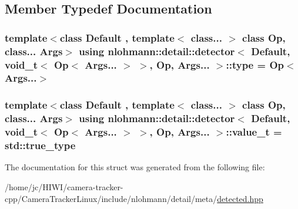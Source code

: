 \subsection{Member Typedef Documentation}
\subsubsection[{\texorpdfstring{type}{type}}]{\setlength{\rightskip}{0pt plus 5cm}template$<$class Default , template$<$ class... $>$ class Op, class... Args$>$ using {\bf nlohmann\+::detail\+::detector}$<$ Default, {\bf void\+\_\+t}$<$ Op$<$ Args... $>$ $>$, Op, Args... $>$\+::{\bf type} =  Op$<$Args...$>$}\hypertarget{structnlohmann_1_1detail_1_1detector_3_01_default_00_01void__t_3_01_op_3_01_args_8_8_8_01_4_01_4_00_01_op_00_01_args_8_8_8_01_4_a5afd6a40e94dde21d120ac646468c495}{}\label{structnlohmann_1_1detail_1_1detector_3_01_default_00_01void__t_3_01_op_3_01_args_8_8_8_01_4_01_4_00_01_op_00_01_args_8_8_8_01_4_a5afd6a40e94dde21d120ac646468c495}
\subsubsection[{\texorpdfstring{value\+\_\+t}{value_t}}]{\setlength{\rightskip}{0pt plus 5cm}template$<$class Default , template$<$ class... $>$ class Op, class... Args$>$ using {\bf nlohmann\+::detail\+::detector}$<$ Default, {\bf void\+\_\+t}$<$ Op$<$ Args... $>$ $>$, Op, Args... $>$\+::{\bf value\+\_\+t} =  std\+::true\+\_\+type}\hypertarget{structnlohmann_1_1detail_1_1detector_3_01_default_00_01void__t_3_01_op_3_01_args_8_8_8_01_4_01_4_00_01_op_00_01_args_8_8_8_01_4_ab748f9f00bb31bee4978a033589f8c85}{}\label{structnlohmann_1_1detail_1_1detector_3_01_default_00_01void__t_3_01_op_3_01_args_8_8_8_01_4_01_4_00_01_op_00_01_args_8_8_8_01_4_ab748f9f00bb31bee4978a033589f8c85}


The documentation for this struct was generated from the following file\+:\begin{DoxyCompactItemize}
\item 
/home/jc/\+H\+I\+W\+I/camera-\/tracker-\/cpp/\+Camera\+Tracker\+Linux/include/nlohmann/detail/meta/\hyperlink{detected_8hpp}{detected.\+hpp}\end{DoxyCompactItemize}
